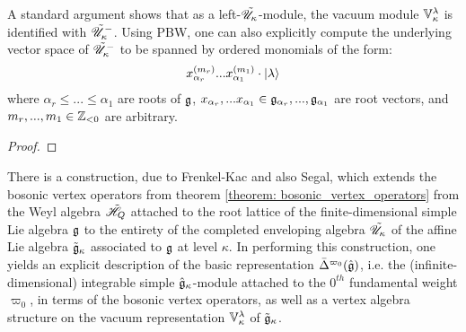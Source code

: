         A standard argument shows that as a left-$\tilde{\mathscr{U}}_{\kappa}$-module, the vacuum module $\mathbb{V}_{\kappa}^{\lambda}$ is identified with $\tilde{\mathscr{U}}_{\kappa}^-$. Using PBW, one can also explicitly compute the underlying vector space of $\tilde{\mathscr{U}}_{\kappa}^-$ to be spanned by ordered monomials of the form:
            $$x_{\alpha_r}^{(m_r)} ... x_{\alpha_1}^{(m_1)} \cdot \lvert {\lambda} \rangle$$
        where $\alpha_r \leq ... \leq \alpha_1$ are roots of $\mathfrak{g}$, $x_{\alpha_r}, ... x_{\alpha_1} \in \mathfrak{g}_{\alpha_r}, ..., \mathfrak{g}_{\alpha_1}$ are root vectors, and $m_r, ..., m_1 \in \mathbb{Z}_{< 0}$ are arbitrary. 

        \begin{theorem} \label{theorem: universal_affine_VOAs}
            
        \end{theorem}
            \begin{proof}
                
            \end{proof}
    
        There is a construction, due to Frenkel-Kac and also Segal, which extends the bosonic vertex operators from theorem \ref{theorem: bosonic_vertex_operators} from the Weyl algebra $\tilde{\mathscr{H}}_Q$ attached to the root lattice of the finite-dimensional simple Lie algebra $\mathfrak{g}$ to the entirety of the completed enveloping algebra $\tilde{\mathscr{U}}_{\kappa}$ of the affine Lie algebra $\tilde{\mathfrak{g}}_{\kappa}$ associated to $\mathfrak{g}$ at level $\kappa$. In performing this construction, one yields an explicit description of the basic representation $\bar{\Delta}^{\varpi_0}(\hat{\mathfrak{g}})$, i.e. the (infinite-dimensional) integrable simple $\hat{\mathfrak{g}}_{\kappa}$-module attached to the $0^{th}$ fundamental weight $\varpi_0$, in terms of the bosonic vertex operators, as well as a vertex algebra structure on the vacuum representation $\mathbb{V}_{\kappa}^{\lambda}$ of $\tilde{\mathfrak{g}}_{\kappa}$.


